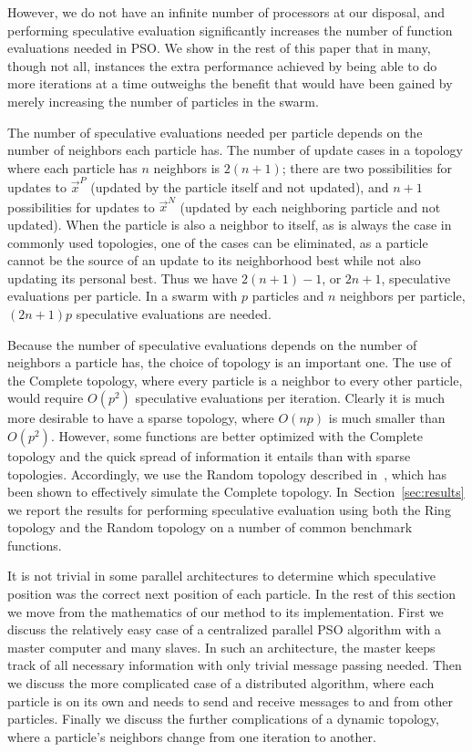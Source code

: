 \documentclass[journal,letterpaper]{IEEEtran}
\renewcommand{\sec}[1]{Section~\ref{sec:#1}}
\providecommand{\pers}{\ensuremath{P}}
\providecommand{\neigh}{\ensuremath{N}}
\providecommand{\nbest}{\ensuremath{\Vec{x}^\neigh}}
\providecommand{\pbest}{\ensuremath{\Vec{x}^\pers}}
\begin{document}
However, we do not have an infinite number of processors at our disposal, and
performing speculative evaluation significantly increases the number of
function evaluations needed in PSO.  We show in the rest of this paper that in
many, though not all, instances the extra performance achieved by being able to
do more iterations at a time outweighs the benefit that would have been gained
by merely increasing the number of particles in the swarm.

The number of speculative evaluations needed per particle depends on the number
of neighbors each particle has.  The number of update cases in a topology where
each particle has $n$ neighbors is $2(n+1)$; there are two possibilities for
updates to $\pbest$ (updated by the particle itself and not updated), and $n+1$
possibilities for updates to $\nbest$ (updated by each neighboring particle and
not updated).  When the particle is also a neighbor to itself, as is always the
case in commonly used topologies, one of the cases can be eliminated, as a
particle cannot be the source of an update to its neighborhood best while not
also updating its personal best.  Thus we have $2(n+1)-1$, or $2n+1$,
speculative evaluations per particle.  In a swarm with $p$ particles and $n$
neighbors per particle, $(2n+1)p$ speculative evaluations are needed.

Because the number of speculative evaluations depends on the number of
neighbors a particle has, the choice of topology is an important one.  The use
of the Complete topology, where every particle is a neighbor to every other
particle, would require $O(p^2)$ speculative evaluations per iteration.
Clearly it is much more desirable to have a sparse topology, where $O(np)$ is
much smaller than $O(p^2)$.  However, some functions are better optimized with
the Complete topology and the quick spread of information it entails than with
sparse topologies.  Accordingly, we use the Random topology described
in~\cite{mcnabb-2009-large-particle-swarms}, which has been shown to effectively simulate the
Complete topology.  In~\sec{results} we report the results for performing
speculative evaluation using both the Ring topology and the Random topology on
a number of common benchmark functions.

It is not trivial in some parallel architectures to determine which speculative
position was the correct next position of each particle.  In the rest of this
section we move from the mathematics of our method to its implementation.
First we discuss the relatively easy case of a centralized parallel PSO
algorithm with a master computer and many slaves.  In such an architecture, the
master keeps track of all necessary information with only trivial message
passing needed.  Then we discuss the more complicated case of a distributed
algorithm, where each particle is on its own and needs to send and receive
messages to and from other particles.  Finally we discuss the further
complications of a dynamic topology, where a particle's neighbors change from
one iteration to another.
\end{document}
